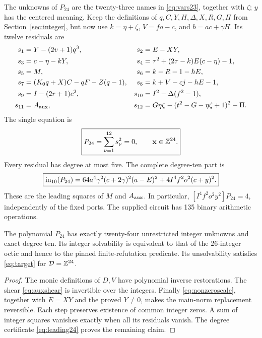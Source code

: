 The unknowns of $P_{24}$ are the twenty-three names in
\eqref{eq:vars23}, together with $\zeta$; $y$ has the centered meaning.
Keep the definitions of $q,C,Y,H,\Delta,X,R,G,\Pi$ from
Section~\ref{sec:integer}, but now use $k=\eta+\zeta$, $V=fo-c$,
and $b=ac+\gamma H$. Its twelve residuals are
\begin{align}
 s_1&=Y-(2v+1)q^3, &
 s_2&=E-XY,\nonumber\\
 s_3&=c-\eta-kY, &
 s_4&=\tau^2+(2\tau-k)E(c-\eta)-1,\nonumber\\
 s_5&=M, &
 s_6&=k-R-1-hE,\nonumber\\
 s_7&=(K_0q+X)C-qF-Z(q-1), &
 s_8&=k+V-cj-hE-1,\nonumber\\
 s_9&=I-(2r+1)c^2, &
 s_{10}&=I^2-\Delta(f^2-1),\nonumber\\
 s_{11}&=A_{\rm aux}, &
 s_{12}&=G\eta\zeta-(t^2-G-\eta\zeta+1)^2-\Pi.
 \label{eq:24residuals}
\end{align}
The single equation is
\begin{equation}
 \boxed{P_{24}=\sum_{\nu=1}^{12}s_\nu^2=0,
 \qquad\mathbf x\in\mathbb Z^{24}.}
 \label{eq:P24}
\end{equation}
Every residual has degree at most five. The complete degree-ten part is
\begin{equation}
 \boxed{\operatorname{in}_{10}(P_{24})=
 64a^4\gamma^2(c+2\gamma)^2(a-E)^2
 +4I^4f^2o^2(c+y)^2.}
 \label{eq:leading24}
\end{equation}
These are the leading squares of $M$ and $A_{\rm aux}$. In particular,
$[I^4f^2o^2y^2]P_{24}=4$, independently of the fixed ports.
The supplied circuit has 135 binary arithmetic operations.

\begin{theorem}
The polynomial $P_{24}$ has exactly twenty-four unrestricted integer
unknowns and exact degree ten. Its integer solvability is equivalent to
that of the 26-integer octic and hence to the pinned finite-refutation
predicate. Its unsolvability satisfies \eqref{eq:target} for
$\mathcal D=\mathbb Z^{24}$.
\end{theorem}
\begin{proof}
The monic definitions of $D,V$ have polynomial inverse restorations.
The shear \eqref{eq:auxshear} is invertible over the integers.
Finally \eqref{eq:nonzeroscale}, together with $E=XY$ and the proved
$Y\ne0$, makes the main-norm replacement reversible. Each step preserves
existence of common integer zeros. A sum of integer squares vanishes
exactly when all its residuals vanish. The degree certificate
\eqref{eq:leading24} proves the remaining claim.
\end{proof}

